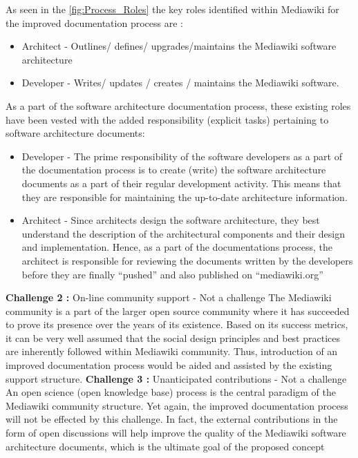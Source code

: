 As seen in the \autoref{fig:Process_Roles} the key roles identified within Mediawiki for the improved documentation process are :
\begin{itemize}
\item Architect - Outlines/ defines/ upgrades/maintains the Mediawiki software architecture
\item Developer - Writes/ updates / creates / maintains the Mediawiki software.
\end{itemize}
As a part of the software architecture documentation process, these existing roles have been vested with the added responsibility (explicit tasks) pertaining to software architecture documents:
\begin{itemize}
\item Developer - The prime responsibility of the software developers as a part of the documentation process is to create (write) the software architecture documents as a part of their regular development activity. This means that they are responsible for maintaining the up-to-date architecture information.
\item Architect - Since architects design the software architecture, they best understand the description of the architectural components and their design and implementation. Hence, as a part of the documentations process, the architect is responsible for reviewing the documents written by the developers before they are finally \enquote{pushed} and also published on \enquote{mediawiki.org}
\end{itemize}

\textbf{Challenge 2 : }On-line community support - Not a challenge 
\indent The Mediawiki community is a part of the larger open source community where it has succeeded to prove its presence over the years of its existence. Based on its success metrics, it can be very well assumed that the social design principles and best practices are inherently followed within Mediawiki community. Thus, introduction of an improved documentation process would be aided and assisted by the existing support structure.
\newline \newline
\textbf{Challenge 3 : } Unanticipated contributions - Not a challenge
\indent An open science (open knowledge base) process is the central paradigm of the Mediawiki community structure. Yet again, the improved documentation process will not be effected by this challenge. In fact, the external contributions in the form of open discussions will help improve the quality of the Mediawiki software architecture documents, which is the ultimate goal of the proposed concept

